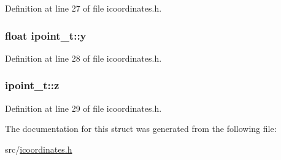 Definition at line 27 of file icoordinates.\-h.

\hypertarget{structipoint__t_a88ca543f1508de060b4738cfebb51b04}{
\subsubsection[{y}]{\setlength{\rightskip}{0pt plus 5cm}float ipoint\-\_\-t\-::y}}\label{structipoint__t_a88ca543f1508de060b4738cfebb51b04}


Definition at line 28 of file icoordinates.\-h.

\hypertarget{structipoint__t_ad1680bc07190dabf544e86824b82e44b}{
\subsubsection[{z}]{ ipoint\-\_\-t\-::z}}\label{structipoint__t_ad1680bc07190dabf544e86824b82e44b}


Definition at line 29 of file icoordinates.\-h.



The documentation for this struct was generated from the following file\-:\begin{DoxyCompactItemize}
\item 
src/\hyperlink{icoordinates_8h}{icoordinates.\-h}\end{DoxyCompactItemize}
